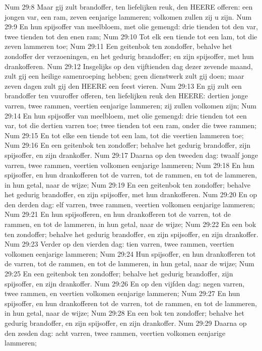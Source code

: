 Num 29:8  Maar gij zult brandoffer, ten liefelijken reuk, den HEERE offeren: een jongen var, een ram, zeven eenjarige lammeren; volkomen zullen zij u zijn.
Num 29:9  En hun spijsoffer van meelbloem, met olie gemengd: drie tienden tot den var, twee tienden tot den enen ram;
Num 29:10  Tot elk een tiende tot een lam, tot die zeven lammeren toe;
Num 29:11  Een geitenbok ten zondoffer, behalve het zondoffer der verzoeningen, en het gedurig brandoffer; en zijn spijsoffer, met hun drankofferen.
Num 29:12  Insgelijks op den vijftienden dag dezer zevende maand, zult gij een heilige samenroeping hebben; geen dienstwerk zult gij doen; maar zeven dagen zult gij den HEERE een feest vieren.
Num 29:13  En gij zult een brandoffer ten vuuroffer offeren, ten liefelijken reuk den HEERE: dertien jonge varren, twee rammen, veertien eenjarige lammeren; zij zullen volkomen zijn;
Num 29:14  En hun spijsoffer van meelbloem, met olie gemengd: drie tienden tot een var, tot die dertien varren toe; twee tienden tot een ram, onder die twee rammen;
Num 29:15  En tot elke een tiende tot een lam, tot die veertien lammeren toe;
Num 29:16  En een geitenbok ten zondoffer; behalve het gedurig brandoffer, zijn spijsoffer, en zijn drankoffer.
Num 29:17  Daarna op den tweeden dag: twaalf jonge varren, twee rammen, veertien volkomen eenjarige lammeren;
Num 29:18  En hun spijsoffer, en hun drankofferen tot de varren, tot de rammen, en tot de lammeren, in hun getal, naar de wijze;
Num 29:19  En een geitenbok ten zondoffer; behalve het gedurig brandoffer, en zijn spijsoffer, met hun drankofferen.
Num 29:20  En op den derden dag: elf varren, twee rammen, veertien volkomen eenjarige lammeren;
Num 29:21  En hun spijsofferen, en hun drankofferen tot de varren, tot de rammen, en tot de lammeren, in hun getal, naar de wijze;
Num 29:22  En een bok ten zondoffer; behalve het gedurig brandoffer, en zijn spijsoffer, en zijn drankoffer.
Num 29:23  Verder op den vierden dag: tien varren, twee rammen, veertien volkomen eenjarige lammeren;
Num 29:24  Hun spijsoffer, en hun drankofferen tot de varren, tot de rammen, en tot de lammeren, in hun getal, naar de wijze;
Num 29:25  En een geitenbok ten zondoffer; behalve het gedurig brandoffer, zijn spijsoffer, en zijn drankoffer.
Num 29:26  En op den vijfden dag: negen varren, twee rammen, en veertien volkomen eenjarige lammeren;
Num 29:27  En hun spijsoffer, en hun drankofferen tot de varren, tot de rammen, en tot de lammeren, in hun getal, naar de wijze;
Num 29:28  En een bok ten zondoffer; behalve het gedurig brandoffer, en zijn spijsoffer, en zijn drankoffer.
Num 29:29  Daarna op den zesden dag: acht varren, twee rammen, veertien volkomen eenjarige lammeren;
